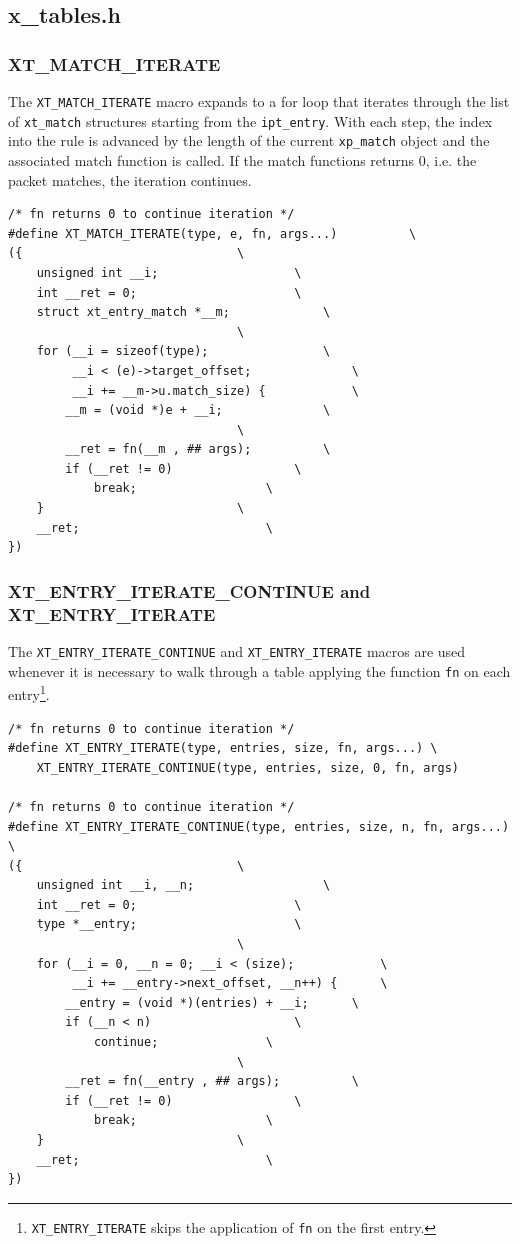 \documentclass[a4paper,10pt]{article}
\newcommand{\code}[1]{\texttt{{#1}}}
\begin{document}
\subsection{x\_tables.h}

\subsubsection{XT\_MATCH\_ITERATE}

The \code{XT\_MATCH\_ITERATE} macro expands to a for loop that
iterates through the list of \code{xt\_match} structures starting from
the \code{ipt\_entry}. With each step, the index into the rule is
advanced by the length of the current \code{xp\_match} object and the
associated match function is called. If the match functions returns 0,
i.e. the packet matches, the iteration continues.


\begin{lstlisting}
/* fn returns 0 to continue iteration */
#define XT_MATCH_ITERATE(type, e, fn, args...)			\
({								\
	unsigned int __i;					\
	int __ret = 0;						\
	struct xt_entry_match *__m;				\
								\
	for (__i = sizeof(type);				\
	     __i < (e)->target_offset;				\
	     __i += __m->u.match_size) {			\
		__m = (void *)e + __i;				\
								\
		__ret = fn(__m , ## args);			\
		if (__ret != 0)					\
			break;					\
	}							\
	__ret;							\
})

\end{lstlisting}


\subsubsection{XT\_ENTRY\_ITERATE\_CONTINUE and XT\_ENTRY\_ITERATE}

The \code{XT\_ENTRY\_ITERATE\_CONTINUE} and \code{XT\_ENTRY\_ITERATE}
macros are used whenever it is necessary to walk through a table
applying the function \code{fn} on each
entry\footnote{\code{XT\_ENTRY\_ITERATE} skips the application of
  \code{fn} on the first entry.}.

\begin{lstlisting}
/* fn returns 0 to continue iteration */
#define XT_ENTRY_ITERATE(type, entries, size, fn, args...) \
	XT_ENTRY_ITERATE_CONTINUE(type, entries, size, 0, fn, args)

/* fn returns 0 to continue iteration */
#define XT_ENTRY_ITERATE_CONTINUE(type, entries, size, n, fn, args...) \
({								\
	unsigned int __i, __n;					\
	int __ret = 0;						\
	type *__entry;						\
								\
	for (__i = 0, __n = 0; __i < (size);			\
	     __i += __entry->next_offset, __n++) { 		\
		__entry = (void *)(entries) + __i;		\
		if (__n < n)					\
			continue;				\
								\
		__ret = fn(__entry , ## args);			\
		if (__ret != 0)					\
			break;					\
	}							\
	__ret;							\
})
\end{lstlisting}
\end{document}
